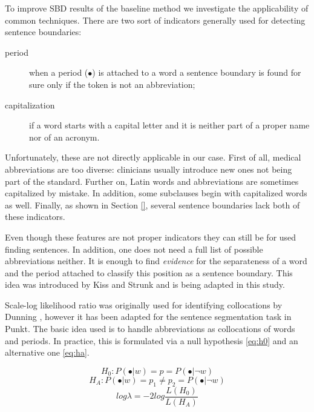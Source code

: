To improve SBD results of the baseline method we investigate the applicability of common techniques. There are two sort of indicators generally used for detecting sentence boundaries: 
\begin{description}
 \item[period] when a period ($\bullet$) is attached to a word a sentence boundary is found for sure only if the token is not an abbreviation;
 \item[capitalization] if a word starts with a capital letter and it is neither part of a proper name nor of an acronym.
\end{description}

Unfortunately, these are not directly applicable in our case. First of all, medical abbreviations are too diverse: clinicians usually introduce new ones not being part of the standard. 
Further on, Latin words and abbreviations are sometimes capitalized by mistake. In addition, some subclauses begin with capitalized words as well. 
Finally, as shown in Section \ref{}, several sentence boundaries lack both of these indicators.

Even though these features are not proper indicators they can still be for used finding sentences. In addition, one does not need a full list of possible abbreviations neither. It is enough to find \emph{evidence} for the separateness of a word and the period attached to classify this position as a sentence boundary. 
This idea was introduced by Kiss and Strunk \cite{kiss2006unsupervised} and is being adapted in this study.

Scale-log likelihood ratio was originally used for identifying collocations by Dunning \cite{dunning1993accurate}, however it has been adapted for the sentence segmentation task in Punkt. The basic idea used is to handle abbreviations as collocations of words and periods. In practice, this is formulated via a null hypothesis \eqref{eq:h0} and an alternative one \eqref{eq:ha}. 

\begin{equation} \label{eq:h0}
H_0: P(\bullet|w) = p = P(\bullet|\neg w)
\end{equation}
\vspace{-0.5cm}
\begin{equation} \label{eq:ha}
H_A: P(\bullet|w) = p_1 \neq p_2 = P(\bullet|\neg w) 
\end{equation}
\vspace{-0.5cm}
\begin{equation} \label{eq:loglambda}
log \lambda = -2 log \frac{L(H_0)}{L(H_A)}
\end{equation}



